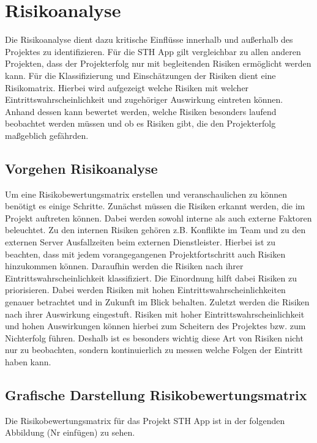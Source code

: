 \chapter{Risikoanalyse}

Die Risikoanalyse dient dazu kritische Einflüsse innerhalb und außerhalb des Projektes zu identifizieren. Für die STH App gilt vergleichbar zu allen anderen Projekten, dass der Projekterfolg nur mit begleitenden Risiken ermöglicht werden kann. Für die Klassifizierung und Einschätzungen der Risiken dient eine Risikomatrix. Hierbei wird aufgezeigt welche Risiken mit welcher Eintrittswahrscheinlichkeit und zugehöriger Auswirkung eintreten können. Anhand dessen kann bewertet werden, welche Risiken besonders laufend beobachtet werden müssen und ob es Risiken gibt, die den Projekterfolg maßgeblich gefährden.

\section{Vorgehen Risikoanalyse}
Um eine Risikobewertungsmatrix erstellen und veranschaulichen zu können benötigt es einige Schritte. Zunächst müssen die Risiken erkannt werden, die im Projekt auftreten können. Dabei werden sowohl interne als auch externe Faktoren beleuchtet. Zu den internen Risiken gehören z.B. Konflikte im Team und zu den externen Server Ausfallzeiten beim externen Dienstleister. Hierbei ist zu beachten, dass mit jedem vorangegangenen Projektfortschritt auch Risiken hinzukommen können. Daraufhin werden die Risiken nach ihrer Eintrittswahrscheinlichkeit klassifiziert. Die Einordnung hilft dabei Risiken zu priorisieren. Dabei werden Risiken mit hohen Eintrittswahrscheinlichkeiten genauer betrachtet und in Zukunft im Blick behalten. Zuletzt werden die Risiken nach ihrer Auswirkung eingestuft. Risiken mit hoher Eintrittswahrscheinlichkeit und hohen Auswirkungen können hierbei zum Scheitern des Projektes bzw. zum Nichterfolg führen. Deshalb ist es besonders wichtig diese Art von Risiken nicht nur zu beobachten, sondern kontinuierlich zu messen welche Folgen der Eintritt haben kann.


\section{Grafische Darstellung Risikobewertungsmatrix}
Die Risikobewertungsmatrix für das Projekt STH App ist in der folgenden Abbildung (Nr einfügen) zu sehen.


